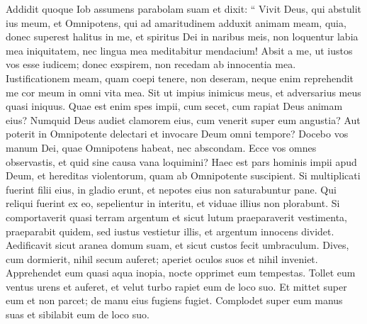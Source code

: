 \begin{biblechapter}
\begin{biblechapter}
\begin{biblechapter}
\begin{biblechapter}
\begin{biblechapter}
\begin{biblechapter}
\begin{biblechapter}
\begin{biblechapter}
\begin{biblechapter}
\begin{biblechapter}
\begin{biblechapter}
\begin{biblechapter}
\begin{biblechapter}
\begin{biblechapter}
\begin{biblechapter}
\begin{biblechapter}
\begin{biblechapter}
\begin{biblechapter}
\begin{biblechapter}
\begin{biblechapter}
\begin{biblechapter}
\begin{biblechapter}
\begin{biblechapter}
\begin{biblechapter}
\begin{biblechapter}
\begin{biblechapter}
\begin{biblechapter}
\verse Addidit quoque Iob assumens parabolam suam et dixit:
 \verse “ Vivit Deus, qui abstulit ius meum, et Omnipotens, qui ad amaritudinem adduxit animam meam,
 \verse quia, donec superest halitus in me,
 et spiritus Dei in naribus meis,
 \verse non loquentur labia mea iniquitatem,
 nec lingua mea meditabitur mendacium!
 \verse Absit a me, ut iustos vos esse iudicem;
 donec exspirem, non recedam ab innocentia mea.
 \verse Iustificationem meam, quam coepi tenere, non deseram,
 neque enim reprehendit me cor meum in omni vita mea.
 \verse Sit ut impius inimicus meus,
 et adversarius meus quasi iniquus.
 \verse Quae est enim spes impii, cum secet,
 cum rapiat Deus animam eius?
 \verse Numquid Deus audiet clamorem eius,
 cum venerit super eum angustia?
 \verse Aut poterit in Omnipotente delectari
 et invocare Deum omni tempore?
 \verse Docebo vos manum Dei,
 quae Omnipotens habeat, nec abscondam.
 \verse Ecce vos omnes observastis,
 et quid sine causa vana loquimini?
 \verse Haec est pars hominis impii apud Deum,
 et hereditas violentorum, quam ab Omnipotente suscipient.
 \verse Si multiplicati fuerint filii eius, in gladio erunt,
 et nepotes eius non saturabuntur pane.
 \verse Qui reliqui fuerint ex eo, sepelientur in interitu,
 et viduae illius non plorabunt.
 \verse Si comportaverit quasi terram argentum
 et sicut lutum praeparaverit vestimenta,
 \verse praeparabit quidem, sed iustus vestietur illis,
 et argentum innocens dividet.
 \verse Aedificavit sicut aranea domum suam,
 et sicut custos fecit umbraculum.
 \verse Dives, cum dormierit, nihil secum auferet;
 aperiet oculos suos et nihil inveniet. 
\verse Apprehendet eum quasi aqua inopia,
 nocte opprimet eum tempestas.
 \verse Tollet eum ventus urens et auferet,
 et velut turbo rapiet eum de loco suo.
 \verse Et mittet super eum et non parcet;
 de manu eius fugiens fugiet.
 \verse Complodet super eum manus suas
 et sibilabit eum de loco suo.
 

\end{biblechapter}
\end{biblechapter}
\end{biblechapter}
\end{biblechapter}
\end{biblechapter}
\end{biblechapter}
\end{biblechapter}
\end{biblechapter}
\end{biblechapter}
\end{biblechapter}
\end{biblechapter}
\end{biblechapter}
\end{biblechapter}
\end{biblechapter}
\end{biblechapter}
\end{biblechapter}
\end{biblechapter}
\end{biblechapter}
\end{biblechapter}
\end{biblechapter}
\end{biblechapter}
\end{biblechapter}
\end{biblechapter}
\end{biblechapter}
\end{biblechapter}
\end{biblechapter}
\end{biblechapter}
